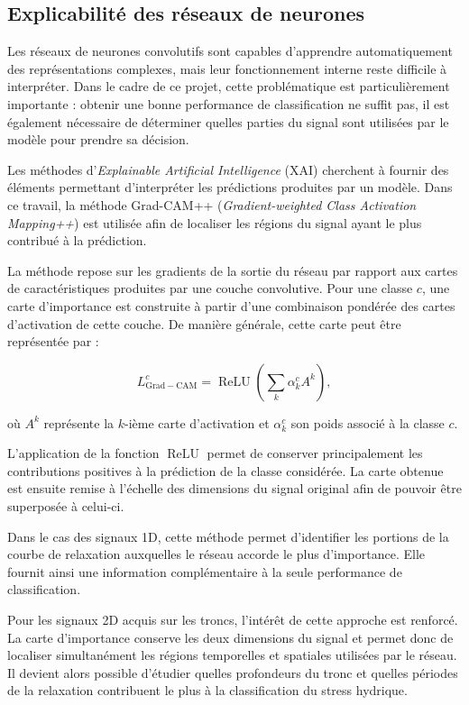 \documentclass[12pt,a4paper,twoside]{article}
\begin{document}
\subsection{Explicabilité des réseaux de neurones}
\label{subsec:explicabilite}

Les réseaux de neurones convolutifs sont capables d'apprendre automatiquement des représentations complexes, mais leur fonctionnement interne reste difficile à interpréter. Dans le cadre de ce projet, cette problématique est particulièrement importante : obtenir une bonne performance de classification ne suffit pas, il est également nécessaire de déterminer quelles parties du signal sont utilisées par le modèle pour prendre sa décision.

Les méthodes d'\textit{Explainable Artificial Intelligence} (XAI) cherchent à fournir des éléments permettant d'interpréter les prédictions produites par un modèle. Dans ce travail, la méthode Grad-CAM++ (\textit{Gradient-weighted Class Activation Mapping++}) est utilisée afin de localiser les régions du signal ayant le plus contribué à la prédiction.

La méthode repose sur les gradients de la sortie du réseau par rapport aux cartes de caractéristiques produites par une couche convolutive. Pour une classe $c$, une carte d'importance est construite à partir d'une combinaison pondérée des cartes d'activation de cette couche. De manière générale, cette carte peut être représentée par :

\begin{equation}
L^c_{\mathrm{Grad-CAM}}
=
\operatorname{ReLU}
\left(
\sum_k \alpha_k^c A^k
\right),
\end{equation}

où $A^k$ représente la $k$-ième carte d'activation et $\alpha_k^c$ son poids associé à la classe $c$.

L'application de la fonction $\operatorname{ReLU}$ permet de conserver principalement les contributions positives à la prédiction de la classe considérée. La carte obtenue est ensuite remise à l'échelle des dimensions du signal original afin de pouvoir être superposée à celui-ci.

Dans le cas des signaux 1D, cette méthode permet d'identifier les portions de la courbe de relaxation auxquelles le réseau accorde le plus d'importance. Elle fournit ainsi une information complémentaire à la seule performance de classification.

Pour les signaux 2D acquis sur les troncs, l'intérêt de cette approche est renforcé. La carte d'importance conserve les deux dimensions du signal et permet donc de localiser simultanément les régions temporelles et spatiales utilisées par le réseau. Il devient alors possible d'étudier quelles profondeurs du tronc et quelles périodes de la relaxation contribuent le plus à la classification du stress hydrique.
\end{document}
